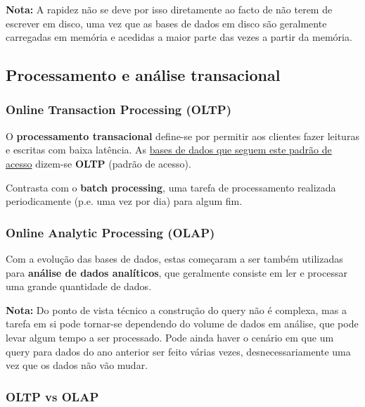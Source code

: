 \documentclass{article}
\begin{document}
\begin{flushleft}
  \textbf{Nota:} A rapidez não se deve por isso diretamente ao facto de não terem de escrever em disco, uma vez que as bases de
  dados em disco são geralmente carregadas em memória e acedidas a maior parte das vezes a partir da memória.
\end{flushleft}

\subsection{Processamento e análise transacional}

\subsubsection{Online Transaction Processing (OLTP)}

O \textbf{processamento transacional} define-se por permitir aos clientes fazer leituras e escritas com
baixa latência. As \uline{bases de dados que seguem este padrão de acesso} dizem-se \textbf{OLTP} (padrão de acesso).

Contrasta com o \textbf{batch processing}, uma tarefa de processamento realizada periodicamente
(p.e. uma vez por dia) para algum fim.

\pagebreak

\subsubsection{Online Analytic Processing (OLAP)}

Com a evolução das bases de dados, estas começaram a ser também utilizadas para \textbf{análise
de dados analíticos}, que geralmente consiste em ler e processar uma grande quantidade de
dados.

\begin{flushleft}
  \textbf{Nota:} Do ponto de vista técnico a construção do
  query não é complexa, mas a tarefa em si pode tornar-se dependendo do
  volume de dados em análise, que pode levar algum tempo a ser processado. Pode ainda haver o cenário em que um
  query para dados do ano anterior ser feito várias vezes, desnecessariamente uma vez que os dados não vão mudar.
\end{flushleft}

\subsubsection{OLTP vs OLAP}
\end{document}
